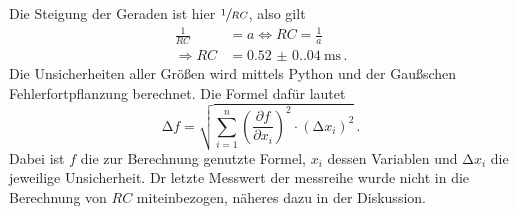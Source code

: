 Die Steigung der Geraden ist hier $\sfrac{1}{RC}$, also gilt
\begin{align*}
    \frac{1}{RC}&=a\Leftrightarrow RC=\frac{1}{a}\\
    \Rightarrow RC&=\qty{0.52(0.04)}{\milli\second}\,.
\end{align*}
Die Unsicherheiten aller Größen wird mittels Python und der Gaußschen 
Fehlerfortpflanzung berechnet. Die Formel dafür lautet
\begin{equation}
    \increment f= \sqrt{\sum_{i=1}^n\left(\frac{\partial f}{\partial x_i}
    \right)^2\cdot (\increment x_i)^2}\,.
    \end{equation}
Dabei ist $f$ die zur Berechnung genutzte Formel, $x_i$ dessen
Variablen und $\increment x_i$ die jeweilige Unsicherheit.
Dr letzte Messwert der messreihe wurde nicht in die Berechnung von $RC$ miteinbezogen,
näheres dazu in der Diskussion.

